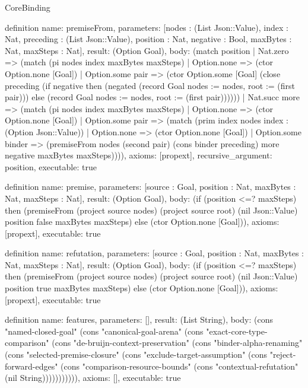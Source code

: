 \begin{lexlean}{CoreBinding}
\begin{semanticmodule}
definition{
 name: premiseFrom,
 parameters: [nodes : (List Json::Value), index : Nat, preceding : (List Json::Value), position : Nat, negative : Bool, maxBytes : Nat, maxSteps : Nat],
 result: (Option Goal),
 body: (match position | Nat.zero => (match (pi nodes index maxBytes maxSteps) | Option.none => (ctor Option.none [Goal]) | Option.some pair => (ctor Option.some [Goal] (close preceding (if negative then (negated (record Goal {nodes := nodes, root := (first pair)})) else (record Goal {nodes := nodes, root := (first pair)}))))) | Nat.succ more => (match (pi nodes index maxBytes maxSteps) | Option.none => (ctor Option.none [Goal]) | Option.some pair => (match (prim index nodes index : (Option Json::Value)) | Option.none => (ctor Option.none [Goal]) | Option.some binder => (premiseFrom nodes (second pair) (cons binder preceding) more negative maxBytes maxSteps)))),
 axioms: [propext],
 recursive_argument: position,
 executable: true
}

definition{
 name: premise,
 parameters: [source : Goal, position : Nat, maxBytes : Nat, maxSteps : Nat],
 result: (Option Goal),
 body: (if (position <=? maxSteps) then (premiseFrom (project source nodes) (project source root) (nil Json::Value) position false maxBytes maxSteps) else (ctor Option.none [Goal])),
 axioms: [propext],
 executable: true
}

definition{
 name: refutation,
 parameters: [source : Goal, position : Nat, maxBytes : Nat, maxSteps : Nat],
 result: (Option Goal),
 body: (if (position <=? maxSteps) then (premiseFrom (project source nodes) (project source root) (nil Json::Value) position true maxBytes maxSteps) else (ctor Option.none [Goal])),
 axioms: [propext],
 executable: true
}

definition{
 name: features,
 parameters: [],
 result: (List String),
 body: (cons "named-closed-goal" (cons "canonical-goal-arena" (cons "exact-core-type-comparison" (cons "de-bruijn-context-preservation" (cons "binder-alpha-renaming" (cons "selected-premise-closure" (cons "exclude-target-assumption" (cons "reject-forward-edges" (cons "comparison-resource-bounds" (cons "contextual-refutation" (nil String))))))))))),
 axioms: [],
 executable: true
}
\end{semanticmodule}
\end{lexlean}
